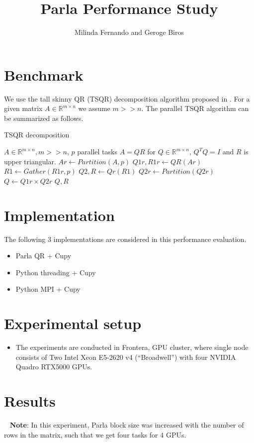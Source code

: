 \documentclass{article}
\title{Parla Performance Study}
\author{Milinda Fernando and Geroge Biros}
\newcommand{\R}{\mathbb{R}}
\begin{document}
\maketitle

\section{Benchmark} 
We use the tall skinny QR (TSQR) decomposition algorithm proposed in \cite{}. For a given matrix $A\in \R^{m\times n}$ we assume $m>>n$. The parallel TSQR algorithm can be summarized as follows. 

\begin{algorithm}
    \caption{TSQR decomposition}
    \begin{algorithmic} 
    \REQUIRE $A \in \R^{m\times n}, m>>n$, $p$ parallel tasks
    \ENSURE $A=QR$ for $Q\in \R^{m\times n }$, $Q^TQ=I$ and $R$ is upper triangular.
    \STATE $Ar \leftarrow Partition(A,p)$
    \STATE $Q1r,R1r \leftarrow QR(Ar)$
    \STATE $R1 \leftarrow Gather(R1r,p)$
    \STATE $Q2,R \leftarrow Qr(R1)$
    \STATE $Q2r \leftarrow Partition(Q2r)$ 
    \STATE $Q\leftarrow Q1r \times Q2r$
    \RETURN $Q,R$
    \end{algorithmic}
\end{algorithm}

\section{Implementation}
The following 3 implementations are considered in this performance evaluation. 
\begin{itemize}
    \item Parla QR + Cupy
    \item Python threading + Cupy
    \item Python MPI + Cupy
\end{itemize}

\section{Experimental setup}
\begin{itemize}
    \item The experiments are conducted in Frontera, GPU cluster, where single node consists of Two Intel Xeon E5-2620 v4 (“Broadwell”) with four NVIDIA Quadro RTX5000 GPUs.
\end{itemize}

\section{Results}
\textbullet~ \textbf{Note}: In this experiment, Parla block size was increased with the number of rows in the matrix, such that we get four tasks for 4 GPUs. 
\end{document}
